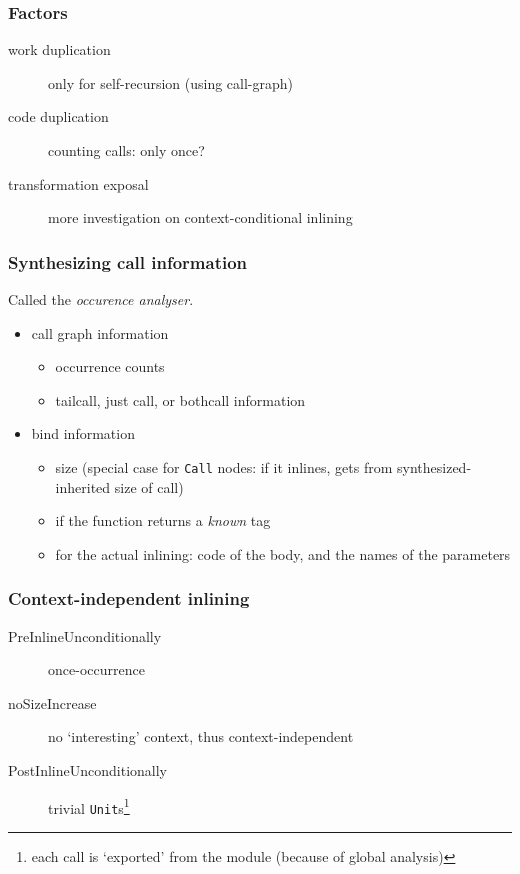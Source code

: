 \documentclass{beamer}
\begin{document}
\begin{frame}[fragile]
\frametitle{Factors}
\begin{description}
\item[work duplication] only for self-recursion (using call-graph)
\item[code duplication] counting calls: only once?
\item[transformation exposal] more investigation on context-conditional inlining
\end{description}
\end{frame}



\begin{frame}[fragile]
\frametitle{Synthesizing call information}
Called the \emph{occurence analyser}.

\begin{itemize}
\item call graph information
\begin{itemize}
\item occurrence counts
\item tailcall, just call, or bothcall information
\end{itemize}
\item bind information
\begin{itemize}
\item size (special case for \texttt{Call} nodes: if it inlines, gets from synthesized-inherited size of call)
\item if the function returns a \emph{known} tag
\item for the actual inlining: code of the body, and the names of the parameters
\end{itemize}
\end{itemize}
\end{frame}



\begin{frame}[fragile]
\frametitle{Context-independent inlining}
\begin{description}
\item[PreInlineUnconditionally] once-occurrence
\item[noSizeIncrease] no `interesting' context, thus context-independent
\item[PostInlineUnconditionally] trivial \texttt{Unit}s\footnote{each call is `exported' from the module (because of global analysis)}
\end{description}
\end{frame}
\end{document}
